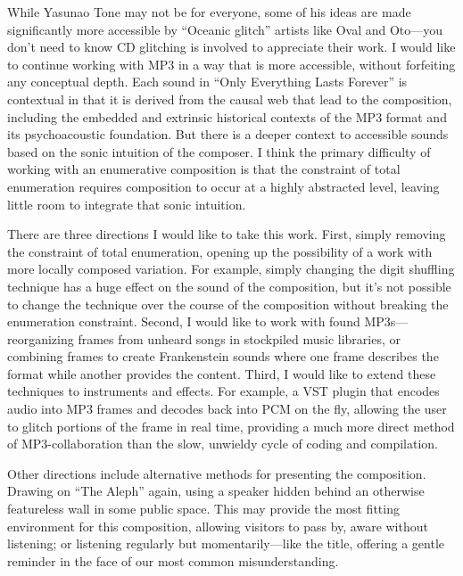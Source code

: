 \documentclass{thesis}
\begin{document}
While Yasunao Tone may not be for everyone, some of his ideas are made significantly more accessible by ``Oceanic glitch''\cite{Sangild04} artists like Oval and Oto---you don't need to know CD glitching is involved to appreciate their work. I would like to continue working with MP3 in a way that is more accessible, without forfeiting any conceptual depth. Each sound in ``Only Everything Lasts Forever'' is contextual in that it is derived from the causal web that lead to the composition, including the embedded and extrinsic historical contexts of the MP3 format and its psychoacoustic foundation. But there is a deeper context to accessible sounds based on the sonic intuition of the composer. I think the primary difficulty of working with an enumerative composition is that the constraint of total enumeration requires composition to occur at a highly abstracted level, leaving little room to integrate that sonic intuition.

There are three directions I would like to take this work. First, simply removing the constraint of total enumeration, opening up the possibility of a work with more locally composed variation. For example, simply changing the digit shuffling technique has a huge effect on the sound of the composition, but it's not possible to change the technique over the course of the composition without breaking the enumeration constraint. Second, I would like to work with found MP3s---reorganizing frames from unheard songs in stockpiled music libraries, or combining frames to create Frankenstein sounds where one frame describes the format while another provides the content. Third, I would like to extend these techniques to instruments and effects. For example, a VST plugin that encodes audio into MP3 frames and decodes back into PCM on the fly, allowing the user to glitch portions of the frame in real time, providing a much more direct method of MP3-collaboration than the slow, unwieldy cycle of coding and compilation.

Other directions include alternative methods for presenting the composition. Drawing on ``The Aleph'' again, using a speaker hidden behind an otherwise featureless wall in some public space. This may provide the most fitting environment for this composition, allowing visitors to pass by, aware without listening; or listening regularly but momentarily---like the title, offering a gentle reminder in the face of our most common misunderstanding.

\begin{singlespace}

\end{singlespace}
\end{document}
